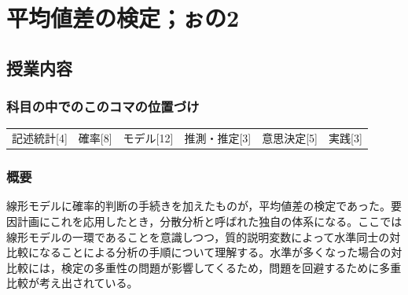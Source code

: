 \section{平均値差の検定；ぉの2}
\label{lesson21}

\subsection{授業内容}
\subsubsection{科目の中でのこのコマの位置づけ}
\begin{tabular}[t]{cccccc}
    記述統計[4] & 確率[8] & モデル[12] & 推測・推定[3] & 意思決定[5] & 実践[3]
\end{tabular}

\subsubsection{概要}
線形モデルに確率的判断の手続きを加えたものが，平均値差の検定であった。要因計画にこれを応用したとき，分散分析と呼ばれた独自の体系になる。ここでは線形モデルの一環であることを意識しつつ，質的説明変数によって水準同士の対比較になることによる分析の手順について理解する。水準が多くなった場合の対比較には，検定の多重性の問題が影響してくるため，問題を回避するために多重比較が考え出されている。
